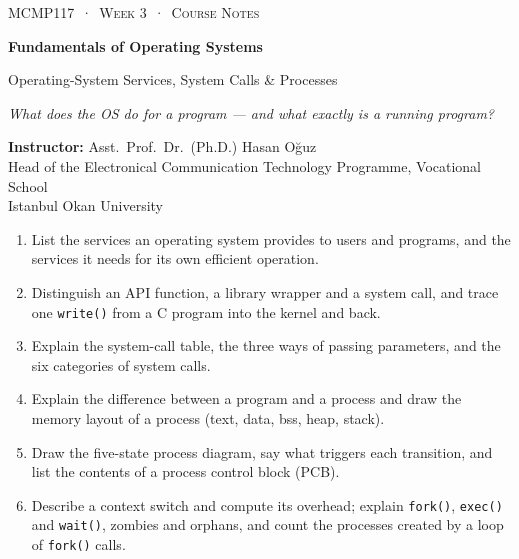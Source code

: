 \documentclass[11pt,a4paper]{article}
\newcommand{\cmd}[1]{\texttt{#1}}
\begin{document}
\setlength{\emergencystretch}{3em}
\thispagestyle{empty}
\begin{tcolorbox}[enhanced,colback=dark,colframe=dark,arc=0pt,boxrule=0pt,
  left=18pt,right=18pt,top=20pt,bottom=20pt,coltext=white]
{\small\color{mint}\textsc{MCMP117 \,·\, Week 3 \,·\, Course Notes}}\par\medskip
{\headfont\fontsize{26}{30}\selectfont\bfseries Fundamentals of Operating Systems}\par\medskip
{\large Operating-System Services, System Calls \& Processes}\par\smallskip
{\small\itshape\color{white!70} What does the OS do for a program --- and what exactly is a running program?}
\end{tcolorbox}

\vspace{0.4em}
{\small
\textbf{Instructor:} Asst.\ Prof.\ Dr.\ (Ph.D.) Hasan Oğuz\\
Head of the Electronical Communication Technology Programme, Vocational School\\
Istanbul Okan University\par}

\vspace{0.8em}
\begin{keyidea}
\begin{enumerate}[leftmargin=1.4em]
  \item List the services an operating system provides to users and programs, and the services it needs for its own efficient operation.
  \item Distinguish an API function, a library wrapper and a system call, and trace one \cmd{write()} from a C program into the kernel and back.
  \item Explain the system-call table, the three ways of passing parameters, and the six categories of system calls.
  \item Explain the difference between a program and a process and draw the memory layout of a process (text, data, bss, heap, stack).
  \item Draw the five-state process diagram, say what triggers each transition, and list the contents of a process control block (PCB).
  \item Describe a context switch and compute its overhead; explain \cmd{fork()}, \cmd{exec()} and \cmd{wait()}, zombies and orphans, and count the processes created by a loop of \cmd{fork()} calls.
\end{enumerate}
\end{keyidea}
\end{document}
